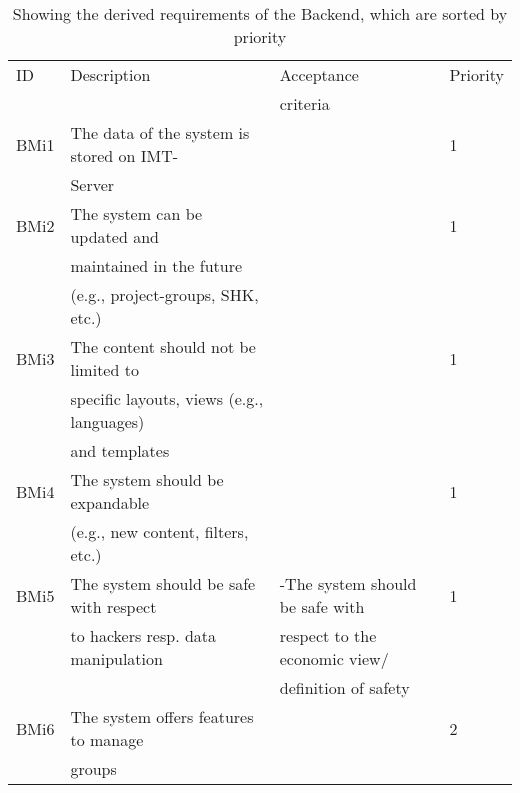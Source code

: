 \begin{table}[h]
\centering%
\begin{tabular}{llll}
	\toprule
ID 	& Description 	& Acceptance 	& Priority \\
 	& 			 & criteria 	&  \\
\cmidrule(rl){1-1}\cmidrule(rl){2-2}\cmidrule(rl){3-3}\cmidrule(rl){4-4}
BMi1 & The data of the system is stored on IMT- 	&  & 1	\\
 	& Server								&  & 		\\
\hline
BMi2 & The system can be updated and  		&  & 1	\\
 	& maintained in the future				&  & 	\\
	& (e.g., project-groups, SHK, etc.)	& 	& \\
\hline
BMi3 & The content should not be limited to		&  	& 1\\
 	& specific layouts, views (e.g., languages)	&	& \\
	& and templates 						&  	& \\
	\hline
BMi4 & The system should be expandable 		&  	& 1	\\
 	& (e.g., new content, filters, etc.)			&  	& 		\\
\hline
BMi5 & The system should be safe with respect 	& -The system should be safe with 	& 1	\\
 	& to hackers resp. data manipulation 		&  respect to the economic view/ 	& 	\\
	&									& definition of safety			&\\
\hline
BMi6 & The system offers features to manage  	&  & 2\\
 	& groups 								&  & \\
	\bottomrule
\end{tabular}
\caption{Showing the derived requirements of the Backend, which are sorted by priority}
\label{RequirementsBackendMisc}
\end{table}

